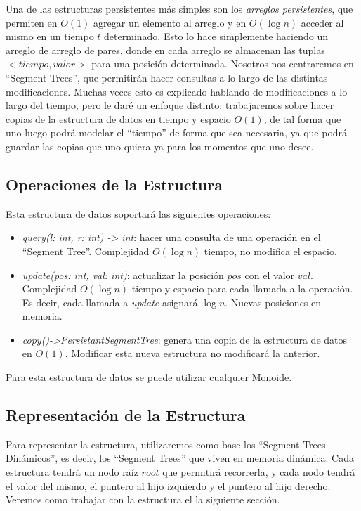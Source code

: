 \documentclass{article}
\begin{document}
Una de las estructuras persistentes más simples son los \textit{arreglos persistentes}, que permiten en $O(1)$ agregar un elemento al arreglo y en $O(\log n)$ acceder al mismo en un tiempo $t$ determinado. Esto lo hace simplemente haciendo un arreglo de arreglo de pares, donde en cada arreglo se almacenan las tuplas $<tiempo,valor>$ para una posición determinada. Nosotros nos centraremos en ``Segment Trees'', que permitirán hacer consultas a lo largo de las distintas modificaciones. Muchas veces esto es explicado hablando de modificaciones a lo largo del tiempo, pero le daré un enfoque distinto: trabajaremos sobre hacer copias de la estructura de datos en tiempo y espacio $O(1)$, de tal forma que uno luego podrá modelar el ``tiempo'' de forma que sea necesaria, ya que podrá guardar las copias que uno quiera ya para los momentos que uno desee.

\subsection{Operaciones de la Estructura}

Esta estructura de datos soportará las siguientes operaciones:
\begin{itemize}
    \item \textit{query(l: int, r: int) -> int}: hacer una consulta de una operación en el ``Segment Tree''. Complejidad $O(\log n)$ tiempo, no modifica el espacio.
    \item \textit{update(pos: int, val: int)}: actualizar la posición $pos$ con el valor $val$. Complejidad $O(\log n)$ tiempo y espacio para cada llamada a la operación. Es decir, cada llamada a \textit{update} asignará $\log n$. Nuevas posiciones en memoria.
    \item \textit{copy()->PersistantSegmentTree}: genera una copia de la estructura de datos en $O(1)$. Modificar esta nueva estructura no modificará la anterior.

\end{itemize}

Para esta estructura de datos se puede utilizar cualquier Monoide.

\subsection{Representación de la Estructura}

Para representar la estructura, utilizaremos como base los ``Segment Trees Dinámicos'', es decir, los ``Segment Trees'' que viven en memoria dinámica. Cada estructura tendrá un nodo raíz $root$ que permitirá recorrerla, y cada nodo tendrá el valor del mismo, el puntero al hijo izquierdo y el puntero al hijo derecho. Veremos como trabajar con la estructura el la siguiente sección.
\end{document}
